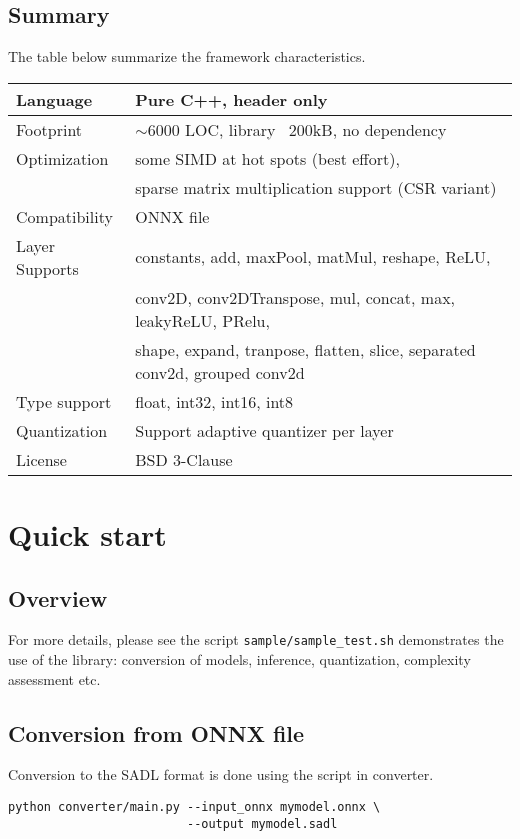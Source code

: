\documentclass[10pt,a4paper]{article}
\begin{document}
\subsection{Summary}
The table below summarize the framework characteristics.
\begin{table}[]
\begin{tabular}{|l|l|}
\hline
Language & Pure C++, header only \\
\hline
Footprint & $\sim 6000$ LOC, library ~200kB, no dependency\\
\hline
Optimization & some SIMD at hot spots (best effort), \\
& sparse matrix multiplication support (CSR variant)\\
\hline
Compatibility & ONNX file\\
\hline
Layer Supports & constants, add, maxPool, matMul, reshape, ReLU, \\
& conv2D, conv2DTranspose, mul, concat, max, leakyReLU, PRelu, \\
& shape, expand, tranpose, flatten, slice, separated conv2d, grouped conv2d  \\
\hline
Type support & float, int32, int16, int8\\
\hline
Quantization & Support adaptive quantizer per layer\\
\hline
License & BSD 3-Clause \\
\hline
\end{tabular}
\end{table}


\section{Quick start}

\subsection{Overview}
For more details, please see the script \texttt{sample/sample\_test.sh} demonstrates the use of the library: conversion of models, inference, quantization, complexity assessment etc.


\subsection{Conversion from ONNX file}
Conversion to the SADL format is done using the script in converter.
\begin{lstlisting}[caption={SADL format conversion},style=code]
python converter/main.py --input_onnx mymodel.onnx \
                         --output mymodel.sadl
\end{lstlisting}
\end{document}
